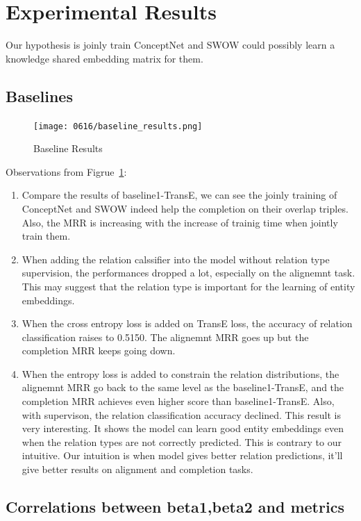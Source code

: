 \clearpage
\section{Experimental Results}
Our hypothesis is joinly train ConceptNet and SWOW could possibly learn a knowledge shared embedding matrix for them. 

\subsection{Baselines}

\begin{figure}[!ht]
    \centering
    \texttt{[image: 0616/baseline\_results.png]}
    \caption{Baseline Results}
    \label{tab:baseline_results}
\end{figure}
Observations from Figrue~\ref{tab:baseline_results}:
\begin{enumerate}
    \item Compare the results of baseline1-TransE, we can see the joinly training of ConceptNet and SWOW indeed help the completion on their overlap triples. Also, the MRR is increasing with the increase of trainig time when jointly train them. 
    \item When adding the relation calssifier into the model without relation type supervision, the performances dropped a lot, especially on the alignemnt task. This may suggest that the relation type is important for the learning of entity embeddings. 
    \item When the cross entropy loss is added on TransE loss, the accuracy of relation classification raises to 0.5150. The alignemnt MRR goes up but the completion MRR keeps going down.  
    \item When the entropy loss is added to constrain the relation distributions, the alignemnt MRR go back to the same level as the baseline1-TransE, and the completion MRR achieves even higher score than baseline1-TransE. Also, with supervison, the relation classification accuracy declined. This result is very interesting. It shows the model can learn good entity embeddings even when the relation types are not correctly predicted. This is contrary to our intuitive. Our intuition is when model gives better relation predictions, it'll give better results on alignment and completion tasks.
\end{enumerate}

\clearpage
\subsection{Correlations between beta1,beta2 and metrics}

